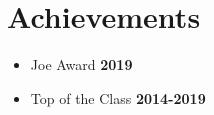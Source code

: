 \documentclass[letterpaper, 11pt]{article}
\newcommand{\secStartSpace}{\vspace{3pt}}
\begin{document}
\section{\color{blue} \textbf{Achievements}}
\secStartSpace

\begin{addmargin}[1em]{1em}
	\begin{itemize}[itemsep=-2.25pt]
		\item Joe Award \hfill  \textbf{2019}
		\item Top of the Class \hfill \textbf{2014-2019}
	\end{itemize}
\end{addmargin}
\end{document}
